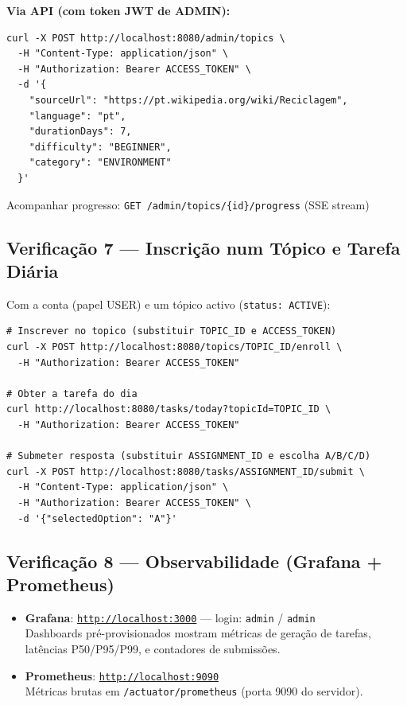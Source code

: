 \documentclass[12pt,a4paper]{article}
\newcommand{\cmd}[1]{\texttt{\small\color{accent}#1}}
\begin{document}
\begin{mdframed}[style=warningbox]
\textbf{Via API (com token JWT de ADMIN):}
\begin{lstlisting}[style=bash]
curl -X POST http://localhost:8080/admin/topics \
  -H "Content-Type: application/json" \
  -H "Authorization: Bearer ACCESS_TOKEN" \
  -d '{
    "sourceUrl": "https://pt.wikipedia.org/wiki/Reciclagem",
    "language": "pt",
    "durationDays": 7,
    "difficulty": "BEGINNER",
    "category": "ENVIRONMENT"
  }'
\end{lstlisting}
Acompanhar progresso: \cmd{GET /admin/topics/\{id\}/progress} (SSE stream)
\end{mdframed}

\subsection{Verificação 7 — Inscrição num Tópico e Tarefa Diária}

Com a conta (papel USER) e um tópico activo (\texttt{status: ACTIVE}):

\begin{lstlisting}[style=bash]
# Inscrever no topico (substituir TOPIC_ID e ACCESS_TOKEN)
curl -X POST http://localhost:8080/topics/TOPIC_ID/enroll \
  -H "Authorization: Bearer ACCESS_TOKEN"

# Obter a tarefa do dia
curl http://localhost:8080/tasks/today?topicId=TOPIC_ID \
  -H "Authorization: Bearer ACCESS_TOKEN"

# Submeter resposta (substituir ASSIGNMENT_ID e escolha A/B/C/D)
curl -X POST http://localhost:8080/tasks/ASSIGNMENT_ID/submit \
  -H "Content-Type: application/json" \
  -H "Authorization: Bearer ACCESS_TOKEN" \
  -d '{"selectedOption": "A"}'
\end{lstlisting}

\subsection{Verificação 8 — Observabilidade (Grafana + Prometheus)}

\begin{itemize}
  \item \textbf{Grafana}: \href{http://localhost:3000}{\texttt{http://localhost:3000}} — login: \texttt{admin} / \texttt{admin}\\
    Dashboards pré-provisionados mostram métricas de geração de tarefas, latências P50/P95/P99, e contadores de submissões.

  \item \textbf{Prometheus}: \href{http://localhost:9090}{\texttt{http://localhost:9090}}\\
    Métricas brutas em \texttt{/actuator/prometheus} (porta 9090 do servidor).
\end{itemize}
\end{document}

